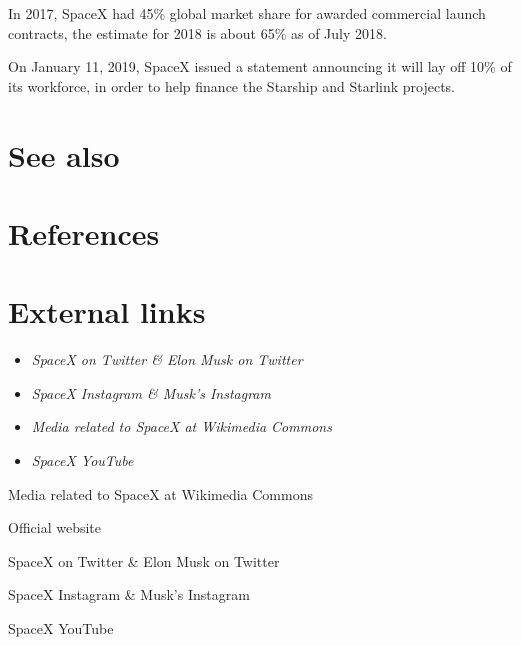 In 2017, SpaceX had 45\% global market share for awarded commercial
launch contracts, the estimate for 2018 is about 65\% as of July 2018.

On January 11, 2019, SpaceX issued a statement announcing it will lay
off 10\% of its workforce, in order to help finance the Starship and
Starlink projects.

\section{See also}\label{see-also}

\section{References}\label{references}

\section{External links}\label{external-links}

\begin{itemize}
\item
  \emph{SpaceX on Twitter \& Elon Musk on Twitter}
\item
  \emph{SpaceX Instagram \& Musk's Instagram}
\item
  \emph{Media related to SpaceX at Wikimedia Commons}
\item
  \emph{SpaceX YouTube}
\end{itemize}

Media related to SpaceX at Wikimedia Commons

Official website

SpaceX on Twitter \& Elon Musk on Twitter

SpaceX Instagram \& Musk's Instagram

SpaceX YouTube
